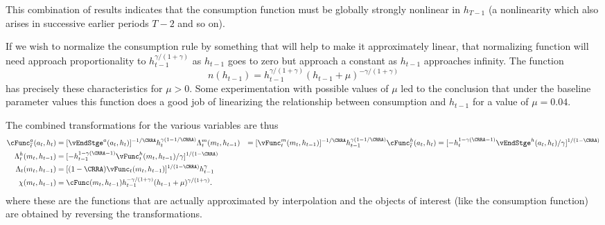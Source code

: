 \documentclass[\econtexRoot/SolvingMicroDSOPs]{subfiles}
\begin{document}
This combination of results indicates that the consumption function
must be globally strongly nonlinear in $h_{T-1}$ (a nonlinearity which
also arises in successive earlier periods $T-2$ and so on).

If we wish to normalize the consumption rule by something that will
help to make it approximately linear, that normalizing function will
need approach proportionality to $h_{t-1}^{\gamma/(1+\gamma)}$ as
$h_{t-1}$ goes to zero but approach a constant as $h_{t-1}$ approaches
infinity.  The function
\begin{equation}
  n(h_{t-1}) =
  h_{t-1}^{\gamma/(1+\gamma)}(h_{t-1}+\mu)^{-\gamma/(1+\gamma)}
\end{equation}
has precisely these characteristics for $\mu>0$.  Some
experimentation with possible values of $\mu$ led to the conclusion
that under the baseline parameter values this function does a good job
of linearizing the relationship between consumption and $h_{t-1}$ for
a value of $\mu = 0.04$.

The combined transformations for the various variables are thus
\begin{equation}\begin{gathered}\begin{aligned}
  \cFunc_{\overline{t}}^{{a}}({a}_{t},h_{t})        & = [\vEndStge^{{a}}({a}_{t},h_{t})]^{-1/\CRRA} h_{t}^{\gamma(1-1/\CRRA)} %
  \Lambda_{t}^{m}({m}_{t},h_{t-1})   & = [{\vFunc}_{t}^{m}({m}_{t},h_{t-1})]^{-1/\CRRA} h_{t-1}^{\gamma(1-1/\CRRA)} %
  \cFunc_{\overline{t}}^{h}({a}_{t},h_{t})
                                                    & =                                                  [-h_{t}^{1-\gamma(\CRRA-1)}\vEndStge^{h}({a}_{t},h_{t})/\gamma]^{1/(1-\CRRA)}  \label{eq:vEndhtransform}
  \\      \Lambda_{t}^{h}({m}_{t},h_{t-1})   & = [-h_{t-1}^{1-\gamma(\CRRA-1)}{\vFunc}_{t}^{h}({m}_{t},h_{t-1})/\gamma]^{1/(1-\CRRA)} %
  \\      \Lambda_{t}({m}_{t},h_{t-1})       & = [(1-\CRRA)
                                               {\vFunc}_{t}({m}_{t},h_{t-1})]^{1/(1-\CRRA)} h_{t-1}^{\gamma} %
  \\  \chi({m}_{t},h_{t-1})       & = \cFunc({m}_{t},h_{t-1})h_{t-1}^{-\gamma/(1+\gamma)}(h_{t-1}+\mu)^{\gamma/(1+\gamma)}.
\end{aligned}\end{gathered}\end{equation}
where these are the functions that are actually approximated by
interpolation and the objects of interest (like the consumption
function) are obtained by reversing the transformations.
\end{document}
